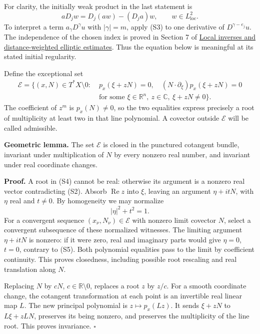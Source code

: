 \documentclass[
  11pt,
]{article}
\begin{document}
For clarity, the initially weak product in the last statement is \[
 aD_jw=D_j(aw)-(D_ja)w,\qquad w\in L^2_{\mathrm{loc}}.             \tag{S3}
\] To interpret a term \(a_\gamma D^\gamma u\) with \(|\gamma|=m\),
apply (S3) to one derivative of \(D^{\gamma-e_j}u\). The independence of
the chosen index is proved in Section 7 of
\href{local-elliptic-coefficients.pdf}{Local inverses and
distance-weighted elliptic estimates}. Thus the equation below is
meaningful at its stated initial regularity.

Define the exceptional set \[
\begin{split}
 \mathcal E=\{(x,N)\in T^*X\setminus0:\;&
 p_x(\xi+zN)=0,\quad
 (N\cdot\partial_\xi)p_x(\xi+zN)=0\\
 &\text{for some }\xi\in\mathbb R^n,\ z\in\mathbb C,
       \ \xi+zN\ne0\}.
\end{split}                                                       \tag{S4}
\] The coefficient of \(z^m\) is \(p_x(N)\ne0\), so the two equalities
express precisely a root of multiplicity at least two in that line
polynomial. A covector outside \(\mathcal E\) will be called admissible.

\textbf{Geometric lemma.} The set \(\mathcal E\) is closed in the
punctured cotangent bundle, invariant under multiplication of \(N\) by
every nonzero real number, and invariant under real coordinate changes.

\textbf{Proof.} A root in (S4) cannot be real: otherwise its argument is
a nonzero real vector contradicting (S2). Absorb \(\operatorname{Re}z\)
into \(\xi\), leaving an argument \(\eta+itN\), with \(\eta\) real and
\(t\ne0\). By homogeneity we may normalize \[
 |\eta|^2+t^2=1.                                                  \tag{S5}
\] For a convergent sequence \((x_\nu,N_\nu)\in\mathcal E\) with nonzero
limit covector \(N\), select a convergent subsequence of these
normalized witnesses. The limiting argument \(\eta+itN\) is nonzero: if
it were zero, real and imaginary parts would give \(\eta=0\), \(t=0\),
contrary to (S5). Both polynomial equalities pass to the limit by
coefficient continuity. This proves closedness, including possible root
rescaling and real translation along \(N\).

Replacing \(N\) by \(cN\), \(c\in\mathbb R\setminus0\), replaces a root
\(z\) by \(z/c\). For a smooth coordinate change, the cotangent
transformation at each point is an invertible real linear map \(L\). The
new principal polynomial is \(z\mapsto p_x(Lz)\). It sends \(\xi+zN\) to
\(L\xi+zLN\), preserves its being nonzero, and preserves the
multiplicity of the line root. This proves invariance. \(\square\)
\end{document}
